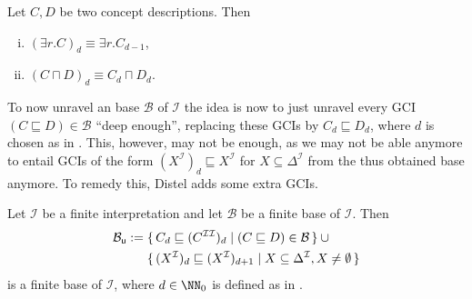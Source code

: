 \begin{Lemma}
  \label{lem:unravelling-is-homomorphism}
  Let $C, D$ be two \ELgfp concept descriptions.  Then
  \begin{enumerate}[i. ]
  \item $(\exists r. C)_d \equiv \exists r. C_{d-1}$,
  \item $(C \sqcap D)_d \equiv C_d \sqcap D_d$.
  \end{enumerate}
\end{Lemma}

To now unravel an \ELgfpbot base $\mathcal{B}$ of $\mathcal{I}$ the idea is now to just
unravel every GCI $(C \sqsubseteq D) \in \mathcal{B}$ ``deep enough'', \ie replacing these
GCIs by $C_d \sqsubseteq D_d$, where $d$ is chosen as in .
This, however, may not be enough, as we may not be able anymore to entail GCIs of the form
$(X^{\mathcal{I}})_d \sqsubseteq X^{\mathcal{I}}$ for $X \subseteq \Delta^{\mathcal{I}}$
from the thus obtained base anymore.  To remedy this, Distel adds some extra GCIs.

\begin{Theorem}
  \label{thm:unravelling-ELgfpbot-bases}
  Let $\mathcal{I}$ be a finite interpretation and let $\mathcal{B}$ be a finite \ELgfpbot
  base of $\mathcal{I}$.  Then
  \begin{align*}
    \mathcal{B}_{\mathsf{u}} &:= \set{ C_d \sqsubseteq (C^{\mathcal{I}\mathcal{I}})_d \mid (C
      \sqsubseteq D) \in \mathcal{B} } \cup {} \\
    &\phantom{{}:={}} \set{ (X^{\mathcal{I}})_d \sqsubseteq (X^{\mathcal{I}})_{d+1} \mid X
      \subseteq \Delta^{\mathcal{I}}, X \neq \emptyset }
  \end{align*}
  is a finite \ELbot base of $\mathcal{I}$, where $d \in \NN_0$ is defined as in
  .
\end{Theorem}


